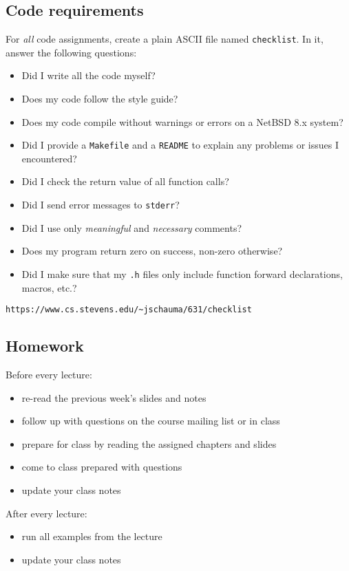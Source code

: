 \documentclass[sxga]{xdvislides}
\begin{document}
\subsection{Code requirements}
For {\em all} code assignments, create a plain ASCII file
named {\tt checklist}.  In it, answer the following
questions:
\begin{itemize}
	\item Did I write all the code myself?
	\item Does my code follow the style guide?
	\item Does my code compile without warnings or errors on a NetBSD 8.x system?
	\item Did I provide a {\tt Makefile} and a {\tt README} to explain any problems or issues I encountered?
	\item Did I check the return value of all function calls?
	\item Did I send error messages to {\tt stderr}?
	\item Did I use only {\em meaningful} and {\em necessary} comments?
	\item Does my program return zero on success, non-zero otherwise?
	\item Did I make sure that my {\tt .h} files only include function forward declarations, macros, etc.?
\end{itemize}

{\tt https://www.cs.stevens.edu/\~{}jschauma/631/checklist}

\subsection{Homework}
Before every lecture:
\begin{itemize}
	\item re-read the previous week's slides and notes
	\item follow up with questions on the course mailing list or in class
	\item prepare for class by reading the assigned chapters and slides
	\item come to class prepared with questions
	\item update your class notes
\end{itemize}
\addvspace{.5in}

After every lecture:
\begin{itemize}
	\item run all examples from the lecture
	\item update your class notes
\end{itemize}
\end{document}
